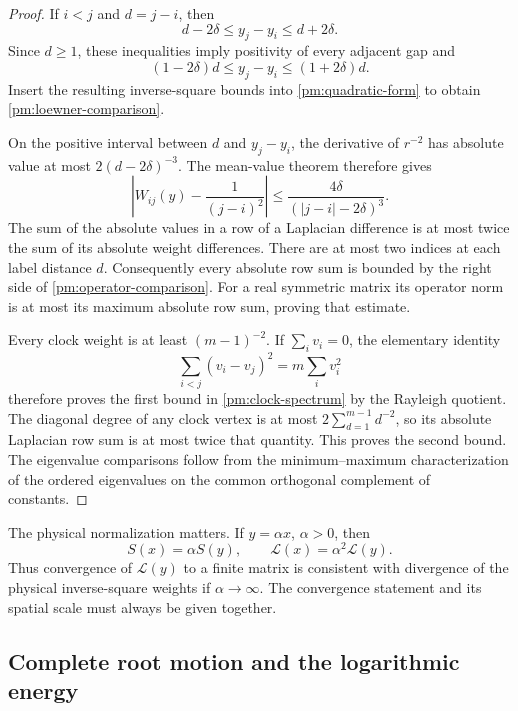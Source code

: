 \begin{proof}
If \(i<j\) and \(d=j-i\), then
\begin{equation}
 d-2\delta\le y_j-y_i\le d+2\delta.
 \label{pm:gap-comparison}
\end{equation}
Since \(d\ge1\), these inequalities imply positivity of every adjacent
gap and
\[
 (1-2\delta)d\le y_j-y_i\le(1+2\delta)d.
\]
Insert the resulting inverse-square bounds into
\eqref{pm:quadratic-form} to obtain
\eqref{pm:loewner-comparison}.

On the positive interval between \(d\) and \(y_j-y_i\), the derivative
of \(r^{-2}\) has absolute value at most \(2(d-2\delta)^{-3}\).
The mean-value theorem therefore gives
\[
 \left|W_{ij}(y)-\frac1{(j-i)^2}\right|
 \le\frac{4\delta}{(|j-i|-2\delta)^3}.
\]
The sum of the absolute values in a row of a Laplacian difference is at
most twice the sum of its absolute weight differences.  There are at most
two indices at each label distance \(d\).  Consequently every absolute
row sum is bounded by the right side of
\eqref{pm:operator-comparison}.  For a real symmetric matrix its operator
norm is at most its maximum absolute row sum, proving that estimate.

Every clock weight is at least \((m-1)^{-2}\).  If
\(\sum_i v_i=0\), the elementary identity
\[
 \sum_{i<j}(v_i-v_j)^2=m\sum_i v_i^2
\]
therefore proves the first bound in \eqref{pm:clock-spectrum} by the
Rayleigh quotient.  The diagonal degree of any clock vertex is at most
\(2\sum_{d=1}^{m-1}d^{-2}\), so its absolute Laplacian row sum is at most
twice that quantity.  This proves the second bound.  The eigenvalue
comparisons follow from the minimum--maximum characterization of the
ordered eigenvalues on the common orthogonal complement of constants.
\end{proof}

The physical normalization matters.  If \(y=\alpha x\), \(\alpha>0\),
then
\begin{equation}
 S(x)=\alpha S(y),\qquad
 \mathcal L(x)=\alpha^2\mathcal L(y).
 \label{pm:spatial-scaling}
\end{equation}
Thus convergence of \(\mathcal L(y)\) to a finite matrix is consistent
with divergence of the physical inverse-square weights if
\(\alpha\to\infty\).  The convergence statement and its spatial scale
must always be given together.

\subsection{Complete root motion and the logarithmic energy}
\label{pm:root-motion-subsection}

